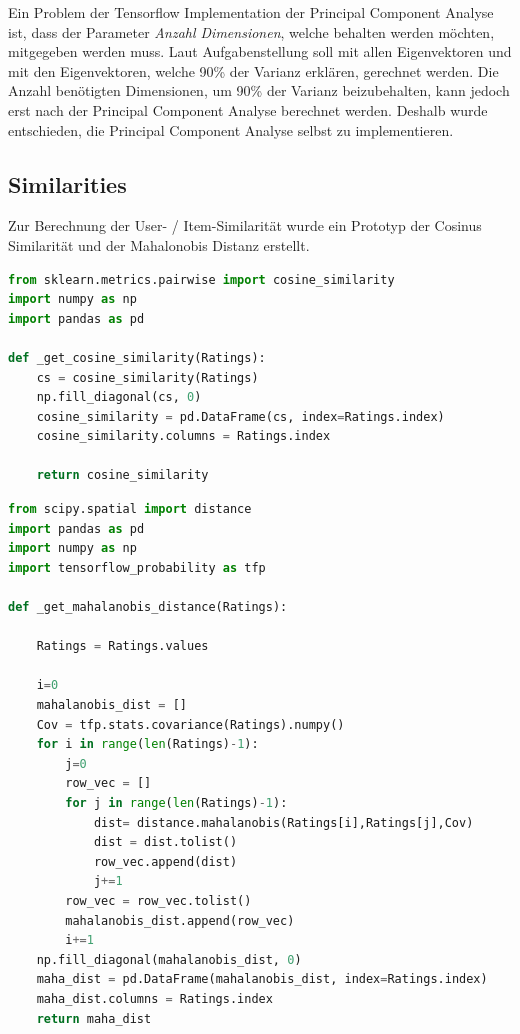 Ein Problem der Tensorflow Implementation der Principal Component Analyse ist, dass der Parameter \textit{Anzahl Dimensionen}, welche behalten werden möchten, mitgegeben werden muss. Laut Aufgabenstellung soll mit allen Eigenvektoren und mit den Eigenvektoren, welche 90\% der Varianz erklären, gerechnet werden. Die Anzahl benötigten Dimensionen, um 90\% der Varianz beizubehalten, kann jedoch erst nach der Principal Component Analyse berechnet werden. Deshalb wurde entschieden, die Principal Component Analyse selbst zu implementieren.

\subsection{Similarities}
Zur Berechnung der User- / Item-Similarität wurde ein Prototyp der Cosinus Similarität und der Mahalonobis Distanz erstellt.

\begin{lstlisting}[language=Python, caption= Cosinus Similarität, label=lst:Cosinus Similarität]
from sklearn.metrics.pairwise import cosine_similarity
import numpy as np
import pandas as pd

def _get_cosine_similarity(Ratings):
    cs = cosine_similarity(Ratings)
    np.fill_diagonal(cs, 0)
    cosine_similarity = pd.DataFrame(cs, index=Ratings.index)
    cosine_similarity.columns = Ratings.index
    
    return cosine_similarity

\end{lstlisting}

\begin{lstlisting}[language=Python, caption= Mahalanobis Distanz, label=lst:Mahalanobis Distanz]
from scipy.spatial import distance
import pandas as pd
import numpy as np
import tensorflow_probability as tfp

def _get_mahalanobis_distance(Ratings):

    Ratings = Ratings.values

    i=0
    mahalanobis_dist = []
    Cov = tfp.stats.covariance(Ratings).numpy()
    for i in range(len(Ratings)-1):
        j=0
        row_vec = []
        for j in range(len(Ratings)-1):
            dist= distance.mahalanobis(Ratings[i],Ratings[j],Cov)
            dist = dist.tolist()
            row_vec.append(dist)
            j+=1
        row_vec = row_vec.tolist()
        mahalanobis_dist.append(row_vec)
        i+=1
    np.fill_diagonal(mahalanobis_dist, 0)
    maha_dist = pd.DataFrame(mahalanobis_dist, index=Ratings.index)
    maha_dist.columns = Ratings.index
    return maha_dist
\end{lstlisting}